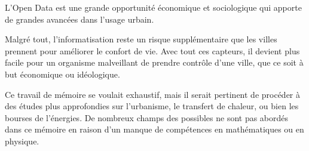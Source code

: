 L'Open Data est une grande opportunité économique et sociologique qui apporte de grandes avancées
dans l'usage urbain.

Malgré tout, l'informatisation reste un risque supplémentaire que les villes prennent pour améliorer
le confort de vie.
Avec tout ces capteurs, il devient plus facile pour un organisme malveillant de prendre contrôle d'une ville,
que ce soit à but économique ou idéologique.

Ce travail de mémoire se voulait exhaustif, mais il serait pertinent de procéder à des études plus approfondies
sur l'urbanisme, le transfert de chaleur, ou bien les bourses de l'énergies.
De nombreux champs des possibles ne sont pas abordés dans ce mémoire en raison d'un manque de compétences en
mathématiques ou en physique.
